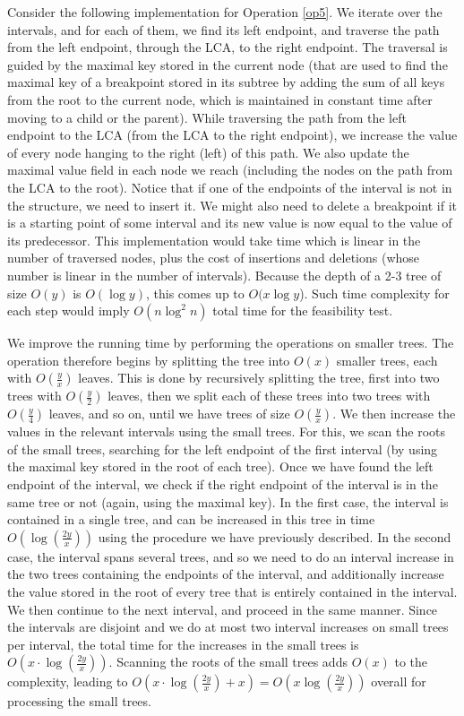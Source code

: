 \documentclass[a4paper,UKenglish]{lipics-v2016}
\theoremstyle{plain}
\begin{document}
\vspace{0.04in} 
Consider the following implementation for Operation \ref{op5}. We iterate over the intervals, and for each of them, we find its left endpoint, and traverse the path from the left endpoint, through the LCA, to the right endpoint.
The traversal is guided by the maximal key stored in the current node (that are used to find the maximal key of a breakpoint stored in its subtree
by adding the sum of all keys from the root to the current node, which is maintained in constant time after moving to a child or the parent).
While traversing the path from the left endpoint to the LCA (from the LCA to the right endpoint), we increase the value of every node hanging to the right (left) of this path. We also update the maximal value field in each node we reach (including the nodes on the path from the LCA to the root). Notice that if one of the endpoints of the interval is not in the structure, we need to insert it. We might also need to delete a breakpoint if it is a starting point of some interval and its new value is now equal to the value of its predecessor. This implementation would take time which is linear in the number of traversed nodes, plus the cost of insertions and deletions (whose number is linear in the number of intervals). Because the depth of a 2-3 tree of size $O(y)$ is $O(\log y)$, this comes up to $O(x \log y$). Such time complexity for each step would imply $O(n\log^{2}n)$ total time for the feasibility test.

We improve the running time by performing the operations on smaller trees. The operation therefore begins by splitting the tree into $O(x)$ smaller trees, each with $O(\frac{y}{x})$ leaves. This is done by recursively splitting the tree, first into two trees with $O(\frac{y}{2})$ leaves, then we split each of these trees into two trees with $O(\frac{y}{4})$ leaves, and so on, until we have trees of size $O(\frac{y}{x})$. We then increase the values in the relevant intervals using the small trees. For this, we scan the roots of the small trees, searching for the left endpoint of the first interval (by using the maximal key stored in the root of each tree). Once we have found the left endpoint of the interval, we check if the right endpoint of the interval is in the same tree or not (again, using the maximal key). In the first case, the interval is contained in a single tree, and can be increased in this tree in time $O(\log(\frac{2y}{x}))$ using the procedure we have previously described. In the second case, the interval spans several trees, and so we need to do an interval increase in the two trees containing the endpoints of the interval, and additionally increase the value stored in the root of every tree that is entirely contained in the interval. We then continue to the next interval, and proceed in the same manner. 
%
Since the intervals are disjoint and we do at most two interval increases on small trees per interval, the total time for the increases in the small trees is $O(x \cdot \log (\frac{2y}{x}))$. Scanning the roots of the small trees adds $O(x)$ to the complexity, leading to 
 $O(x \cdot \log (\frac{2y}{x}) + x) = O(x \log (\frac{2y}{x}))$ overall for processing the small trees.
\end{document}
